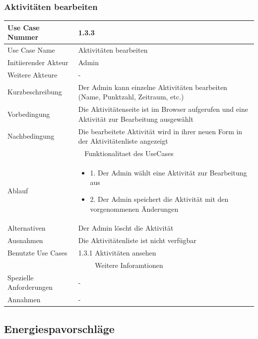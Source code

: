 \documentclass[10pt,a4paper]{article}
\begin{document}
	\subsubsection{Aktivit\"aten bearbeiten}
	\begin{tabular}{|l|p{.5\linewidth}|}
	\hline Use Case Nummer & 1.3.3 \\ 
	\hline Use Case Name & Aktivit\"aten bearbeiten \\ 
	\hline Initiierender Akteur & Admin \\
	\hline Weitere Akteure & - \\
	\hline Kurzbeschreibung & Der Admin kann einzelne Aktivit\"aten bearbeiten (Name, Punktzahl, Zeitraum, etc.) \\
	\hline Vorbedingung & Die Aktivit\"atenseite ist im Browser aufgerufen und eine Aktivit\"at zur Bearbeitung ausgew\"ahlt \\
	\hline Nachbedingung & Die bearbeitete Aktivit\"at wird in ihrer neuen Form in der Aktivit\"atenliste angezeigt \\
	\hline \multicolumn{2}{|c|}{Funktionalitaet des UseCases}\\
	\hline Ablauf & \begin{itemize}
			\item 1. Der Admin w\"ahlt eine Aktivit\"at zur Bearbeitung aus
			\item 2. Der Admin speichert die Aktivit\"at mit den vorgenommenen \"Anderungen
		\end{itemize} \\
	\hline Alternativen & Der Admin l\"oscht die Aktivit\"at \\
	\hline Ausnahmen & Die Aktivit\"atenliste ist nicht verf\"ugbar \\
	\hline Benutzte Use Cases & 1.3.1 Aktivit\"aten ansehen \\
	\hline \multicolumn{2}{|c|}{Weitere Inforamtionen} \\
	\hline Spezielle Anforderungen & - \\
	\hline Annahmen & - \\
	\hline
	\end{tabular} 
\subsection{Energiespavorschl\"age}
\end{document}
